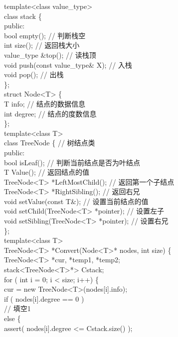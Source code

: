 \begin{question}
template<class value\_type>\\
class stack \{\\
public:\\
bool empty();                        // 判断栈空\\
int size();                          // 返回栈大小\\
value\_type \&top();                  // 读栈顶\\
void push(const value\_type\& X);  // 入栈\\
void pop();                          // 出栈\\
\};\\
struct Node<T> \{\\
T info;                               // 结点的数据信息\\
int degree;                          // 结点的度数信息\\
\};\\
template<class T>\\
class TreeNode \{                         // 树结点类\\
public:\\
bool isLeaf();                       // 判断当前结点是否为叶结点\\
T Value();                            // 返回结点的值\\
TreeNode<T> *LeftMostChild();     // 返回第一个子结点\\
TreeNode<T> *RightSibling();      // 返回右兄\\
void setValue(const T\&);           // 设置当前结点的值\\
void setChild(TreeNode<T> *pointer);    // 设置左子\\
void setSibling(TreeNode<T> *pointer);  // 设置右兄\\
\};\\
template<class T>\\
TreeNode<T> *Convert(Node<T>* nodes, int size) \{\\
TreeNode<T> *cur, *temp1, *temp2;\\
stack<TreeNode<T>*> Cstack;\\
for ( int i = 0; i < size; i++) \{\\
cur = new TreeNode<T>(nodes[i].info);\\
if ( nodes[i].degree == 0 )\\
// 填空1\\
else \{\\
assert( nodes[i].degree <= Cstack.size() );\\

\end{question}
